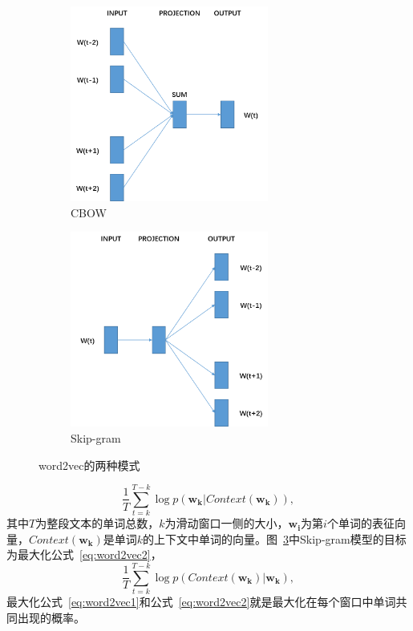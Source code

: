 \begin{figure}[t]

  \begin{subfigure}[t]{0.5\linewidth}  
    \centering
    \includegraphics[width=6.5cm]{cbow.png}

    \caption{CBOW}
    \label{fig:jaccard}
  \end{subfigure}
  \begin{subfigure}[t]{0.5\linewidth}  
    \centering
    \includegraphics[width=6.5cm]{sg.png}

    \caption{Skip-gram}
    \label{fig:f1}
    
  \end{subfigure}  
  
  \caption{word2vec的两种模式}
  \label{fig:word2vec}
\end{figure}

\begin{equation}
  \label{eq:word2vec1}
  \frac{1}{T}\sum_{t=k}^{T-k}\log p(\bm {w_k}|Context(\bm {w_k})),
\end{equation}
其中$T$为整段文本的单词总数，$k$为滑动窗口一侧的大小，$\bm {w_i}$为第$i$个单词的表征向量，$Context(\bm {w_k})$是单词$k$的上下文中单词的向量。图~\ref{fig:word2vec}中Skip-gram模型的目标为最大化公式~\ref{eq:word2vec2}，
\begin{equation}
  \label{eq:word2vec2}
  \frac{1}{T}\sum_{t=k}^{T-k}\log p(Context(\bm {w_k})|\bm {w_k}),
\end{equation}
最大化公式~\ref{eq:word2vec1}和公式~\ref{eq:word2vec2}就是最大化在每个窗口中单词共同出现的概率。\par


